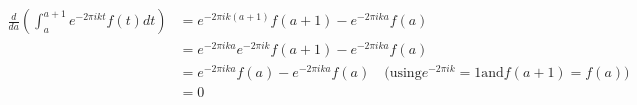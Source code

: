 \begin{align*}
	\frac{d}{da}\left(\int_{a}^{a+1}e^{-2\pi ikt}f(t)dt\right)
	 & =e^{-2\pi ik(a+1)}f(a+1)-e^{-2\pi ika}f(a)                                                 \\
	 & =e^{-2\pi ika}e^{-2\pi ik}f(a+1)-e^{-2\pi ika}f(a)                                         \\
	 & =e^{-2\pi ika}f(a)-e^{-2\pi ika}f(a)\quad\text{(using}e^{-2\pi ik}=1\text{and}f(a+1)=f(a)) \\
	 & =0
\end{align*}